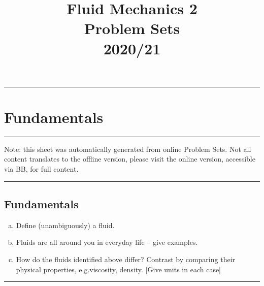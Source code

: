 \documentclass[11pt,a4paper]{article}%
\title{Fluid Mechanics 2\\Problem Sets \\2020/21}
\date{}
\newcommand{\ETrule}{
\begin{center}%
\rule[2.5pt]{\linewidth}{.5pt}%
\end{center}}%
\begin{document}
\ETrule\setcounter{section}{0}\section{Fundamentals}\ETrule Note: this sheet was automatically generated from online Problem Sets. Not all content translates to the offline version, please visit the online version, accessible via BB, for full content.\ETrule\subsection{Fundamentals}
\begin{center}\end{center}\begin{enumerate}[(a)]\item  Define (unambiguously) a fluid.\item Fluids are all around you in everyday life – give examples.\item How do the fluids identified above differ? Contrast by comparing their physical properties, e.g.viscosity, density. [Give units in each case]\end{enumerate}\ETrule
\end{document}
